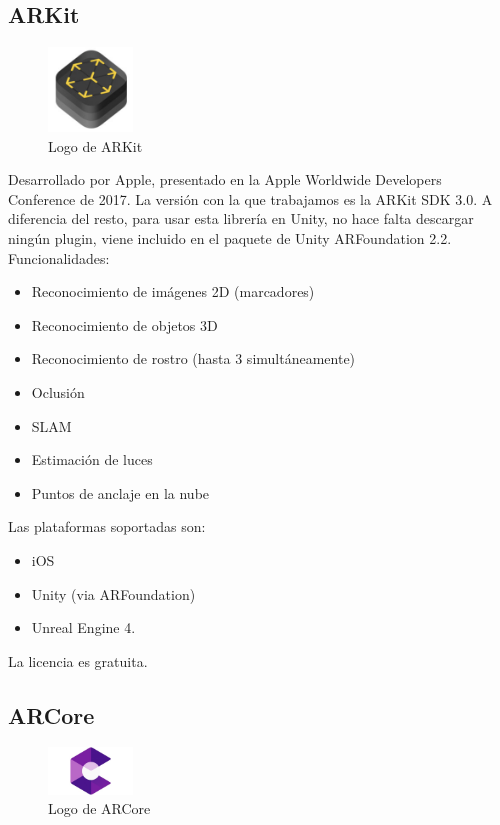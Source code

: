 \subsection{ARKit}
\begin{figure}[H]
    \centering
    \includegraphics[width=0.2\textwidth]{Images/Arkit_Logo.jpeg}
    \caption{Logo de ARKit}
    \label{fig:ARKit}
\end{figure} 

Desarrollado por Apple, presentado en la Apple Worldwide Developers Conference de 2017.
La versión con la que trabajamos es la ARKit SDK 3.0.\cite{AppleDeve} A diferencia del resto, para usar esta librería en Unity, no hace falta descargar ningún plugin, viene incluido en el paquete de Unity ARFoundation 2.2.
Funcionalidades:
\begin{itemize}
\item Reconocimiento de imágenes 2D (marcadores)
\item Reconocimiento de objetos 3D
\item Reconocimiento de rostro (hasta 3 simultáneamente)
\item Oclusión
\item SLAM
\item Estimación de luces
\item Puntos de anclaje en la nube
\end{itemize}
Las plataformas soportadas son:
\begin{itemize}
\item iOS 
\item Unity (via ARFoundation)
\item Unreal Engine 4.\cite{Unreal}
\end{itemize}
La licencia es gratuita.

 
\subsection{ARCore}
 \begin{figure}[H]
    \centering
    \includegraphics[width=0.2\textwidth]{Images/ARCore.jpeg}
    \caption{Logo de ARCore}
    \label{fig:ARCore}
\end{figure}

